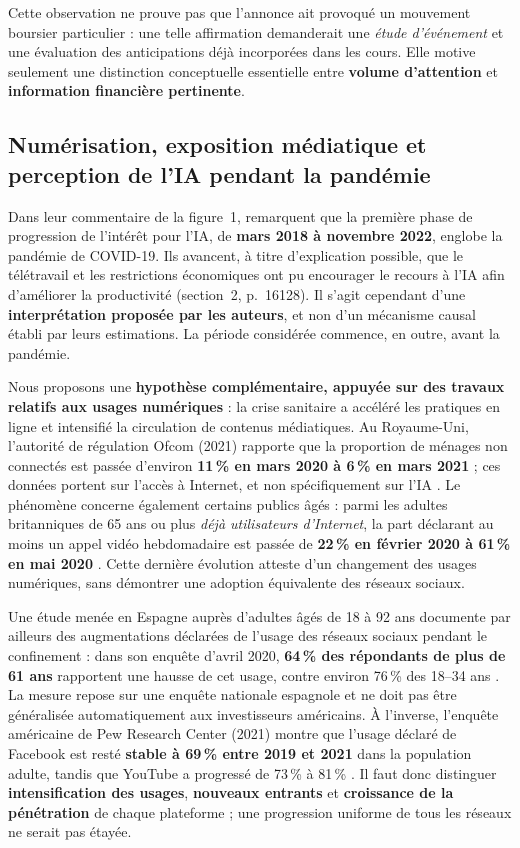 \documentclass[11pt,a4paper]{article}
\begin{document}
Cette observation ne prouve pas que l'annonce ait provoqué un mouvement boursier particulier : une telle affirmation demanderait une \emph{étude d'événement} et une évaluation des anticipations déjà incorporées dans les cours. Elle motive seulement une distinction conceptuelle essentielle entre \textbf{volume d'attention} et \textbf{information financière pertinente}.

\subsection{Numérisation, exposition médiatique et perception de l'IA pendant la pandémie}
Dans leur commentaire de la figure~1, \cite{SalisuBadmus2026} remarquent que la première phase de progression de l'intérêt pour l'IA, de \textbf{mars 2018 à novembre 2022}, englobe la pandémie de COVID-19. Ils avancent, à titre d'explication possible, que le télétravail et les restrictions économiques ont pu encourager le recours à l'IA afin d'améliorer la productivité (section~2, p.~16128). Il s'agit cependant d'une \textbf{interprétation proposée par les auteurs}, et non d'un mécanisme causal établi par leurs estimations. La période considérée commence, en outre, avant la pandémie.

Nous proposons une \textbf{hypothèse complémentaire, appuyée sur des travaux relatifs aux usages numériques} : la crise sanitaire a accéléré les pratiques en ligne et intensifié la circulation de contenus médiatiques. Au Royaume-Uni, l'autorité de régulation Ofcom (2021) rapporte que la proportion de ménages non connectés est passée d'environ \textbf{11\,\% en mars 2020 à 6\,\% en mars 2021} ; ces données portent sur l'accès à Internet, et non spécifiquement sur l'IA \cite{Ofcom2021}. Le phénomène concerne également certains publics âgés : parmi les adultes britanniques de 65 ans ou plus \emph{déjà utilisateurs d'Internet}, la part déclarant au moins un appel vidéo hebdomadaire est passée de \textbf{22\,\% en février 2020 à 61\,\% en mai 2020} \cite{Ofcom2020}. Cette dernière évolution atteste d'un changement des usages numériques, sans démontrer une adoption équivalente des réseaux sociaux.

Une étude menée en Espagne auprès d'adultes âgés de 18 à 92 ans documente par ailleurs des augmentations déclarées de l'usage des réseaux sociaux pendant le confinement : dans son enquête d'avril 2020, \textbf{64\,\% des répondants de plus de 61 ans} rapportent une hausse de cet usage, contre environ 76\,\% des 18--34 ans \cite{Rosen2022}. La mesure repose sur une enquête nationale espagnole et ne doit pas être généralisée automatiquement aux investisseurs américains. À l'inverse, l'enquête américaine de Pew Research Center (2021) montre que l'usage déclaré de Facebook est resté \textbf{stable à 69\,\% entre 2019 et 2021} dans la population adulte, tandis que YouTube a progressé de 73\,\% à 81\,\% \cite{Pew2021}. Il faut donc distinguer \textbf{intensification des usages}, \textbf{nouveaux entrants} et \textbf{croissance de la pénétration} de chaque plateforme ; une progression uniforme de tous les réseaux ne serait pas étayée.
\end{document}
